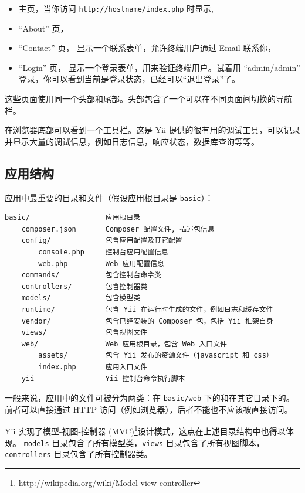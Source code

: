 \begin{itemize}
\item 主页，当你访问 \lstinline|http://hostname/index.php| 时显示,
\item “About” 页，
\item “Contact” 页， 显示一个联系表单，允许终端用户通过 Email 联系你，
\item “Login” 页， 显示一个登录表单，用来验证终端用户。试着用 “admin/admin” 登录，你可以看到当前是登录状态，已经可以“退出登录”了。
\end{itemize}
这些页面使用同一个头部和尾部。头部包含了一个可以在不同页面间切换的导航栏。

在浏览器底部可以看到一个工具栏。这是 Yii 提供的很有用的\hyperref[tool-debugger.md]{调试工具}，可以记录并显示大量的调试信息，例如日志信息，响应状态，数据库查询等等。

\subsection{应用结构 \label{start-workflow.md::application-structure}}
应用中最重要的目录和文件（假设应用根目录是 \lstinline|basic|）：

\begin{lstlisting}
basic/                  应用根目录
    composer.json       Composer 配置文件, 描述包信息
    config/             包含应用配置及其它配置
        console.php     控制台应用配置信息
        web.php         Web 应用配置信息
    commands/           包含控制台命令类
    controllers/        包含控制器类
    models/             包含模型类
    runtime/            包含 Yii 在运行时生成的文件，例如日志和缓存文件
    vendor/             包含已经安装的 Composer 包，包括 Yii 框架自身
    views/              包含视图文件
    web/                Web 应用根目录，包含 Web 入口文件
        assets/         包含 Yii 发布的资源文件（javascript 和 css）
        index.php       应用入口文件
    yii                 Yii 控制台命令执行脚本
\end{lstlisting}
一般来说，应用中的文件可被分为两类：在 \lstinline|basic/web| 下的和在其它目录下的。前者可以直接通过 HTTP 访问（例如浏览器），后者不能也不应该被直接访问。

Yii 实现了模型-视图-控制器 (MVC)\footnote{\url{http://wikipedia.org/wiki/Model-view-controller}}设计模式，这点在上述目录结构中也得以体现。 \lstinline|models| 目录包含了所有\hyperref[structure-models.md]{模型类}，\lstinline|views| 目录包含了所有\hyperref[structure-views.md]{视图脚本}，\lstinline|controllers| 目录包含了所有\hyperref[structure-controllers.md]{控制器类}。

